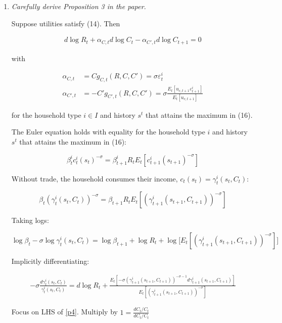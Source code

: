 \documentclass{article}
\newenvironment{manualtheorem}[1]{%
  \renewcommand\themanualtheoreminner{#1}%
  \manualtheoreminner
}{\endmanualtheoreminner}
\begin{document}
\begin{enumerate}

\item \textit{Carefully derive Proposition 3 in the paper.}


\begin{manualtheorem}{3} Suppose utilities satisfy (14). Then

\begin{align*}
d \log R_t + \alpha_{C, t} d \log C_t - \alpha_{C', t} d \log C_{t+1} = 0
\end{align*}

with 

\begin{align*}
\alpha_{C, t} &= C g_{C, t} (R, C, C') = \sigma \varepsilon_t^i\\
\alpha_{C', t} &= -C' g_{C', t} (R, C, C') = \sigma \frac{E_t[u_{c, t+1} \varepsilon_{t+1}^i]}{E_t[u_{c, t+1}]}
\end{align*}

for the household type $i \in I$ and history $s^t$ that attains the maximum in (16).

\end{manualtheorem}

The Euler equation holds with equality for the household type $i$ and history $s^t$ that attains the maximum in (16):

$$
\beta_t^i c_t^i(s_t)^{-\sigma} = \beta_{t+1}^i R_t E_t[c_{t+1}^i(s_{t+1})^{-\sigma}]
$$

Without trade, the household consumes their income, $c_t(s_t) = \gamma_t^i(s_t, C_t)$:

$$
\beta_t (\gamma_t^i(s_t, C_t))^{-\sigma} = \beta_{t+1} R_t E_t[(\gamma_{t+1}^i(s_{t+1}, C_{t+1}))^{-\sigma}]
$$

Taking logs:

$$
\log \beta_t - \sigma \log \gamma_t^i(s_t, C_t) = \log \beta_{t+1} + \log R_t +\log \Big[E_t[(\gamma_{t+1}^i(s_{t+1}, C_{t+1}))^{-\sigma}]\Big]
$$

Implicitly differentiating:

\begin{align}
- \sigma \frac{d\gamma_t^i(s_t, C_t)}{\gamma_t^i(s_t, C_t)} =  d\log R_t +\frac{E_t[-\sigma(\gamma_{t+1}^i(s_{t+1}, C_{t+1}))^{-\sigma-1}d\gamma_{t+1}^i(s_{t+1}, C_{t+1})]}{ E_t[(\gamma_{t+1}^i(s_{t+1}, C_{t+1}))^{-\sigma}]}\label{p4}
\end{align}

Focus on LHS of \ref{p4}.  Multiply by $1 = \frac{dC_t/C_t}{dC_t/C_t}$


\end{enumerate}
\end{document}
